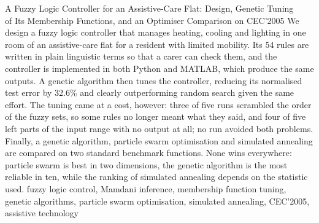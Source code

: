\paperhead
{A Fuzzy Logic Controller for an Assistive-Care Flat: Design, Genetic Tuning\\
of Its Membership Functions, and an Optimiser Comparison on CEC'2005}
{%
We design a fuzzy logic controller that manages heating, cooling and
lighting in one room of an assistive-care flat for a resident with limited
mobility. Its 54 rules are written in plain linguistic terms so that a carer
can check them, and the controller is implemented in both Python and MATLAB,
which produce the same outputs. A genetic algorithm then tunes the controller,
reducing its normalised test error by 32.6\% and clearly outperforming random search given
the same effort. The tuning came at a cost, however: three of five runs
scrambled the order of the fuzzy sets, so some rules no longer meant what they
said, and four of five left parts of the input range with no output at all; no
run avoided both problems. Finally, a genetic algorithm, particle swarm
optimisation and simulated annealing are compared on two standard benchmark
functions. None wins everywhere: particle swarm is best in two dimensions, the
genetic algorithm is the most reliable in ten, while the ranking of
simulated annealing depends on the statistic used.%
}
{fuzzy logic control, Mamdani inference, membership function tuning, genetic
algorithms, particle swarm optimisation, simulated annealing, CEC'2005,
assistive technology}

